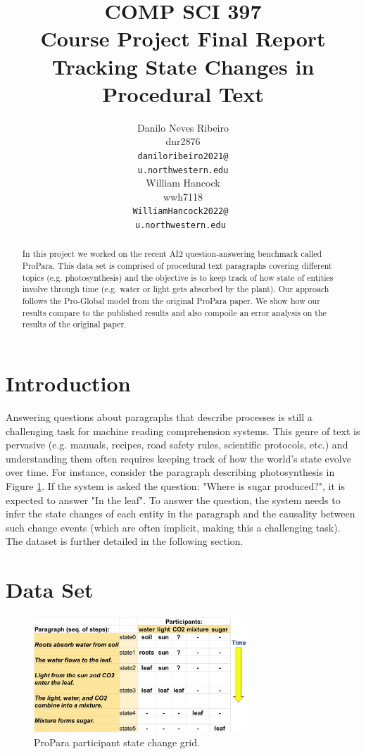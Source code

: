 \documentclass[11pt,a4paper]{article}
\title{COMP SCI 397 \\
    Course Project Final Report \\
    Tracking State Changes in Procedural Text}
\author{Danilo Neves Ribeiro \\
  dnr2876 \\
  {\tt daniloribeiro2021@} \\
  {\tt u.northwestern.edu} \\\And
  William Hancock \\
  wwh7118 \\
  {\tt WilliamHancock2022@ } \\
  {\tt u.northwestern.edu } \\}
\date{}
\begin{document}
\maketitle
\begin{abstract}
  In this project we worked on the recent AI2 question-answering 
  benchmark called ProPara. This data set is comprised of procedural 
  text paragraphs covering different topics (e.g. photosynthesis) and 
  the objective is to keep track of how state of entities involve through 
  time (e.g. water or light gets absorbed by the plant). Our approach 
  follows the Pro-Global model from the original ProPara paper. We 
  show how our results compare to the published results and also 
  compoile an error analysis on the results of the original paper.
\end{abstract}

\section{Introduction}

Answering questions about paragraphs that describe processes is still 
a challenging task for machine reading comprehension systems. This 
genre of text is pervasive (e.g. manuals, recipes, road safety rules, 
scientific protocols, etc.) and understanding them often requires 
keeping track of how the world’s state evolve over time. For instance, 
consider the paragraph describing photosynthesis in Figure 
\ref{fig:participant-grid}. If the system is asked the question: 
"Where is sugar produced?", it is expected to answer "In the leaf". 
To answer the question, the system needs to infer the state changes 
of each entity in the paragraph and the causality between such change 
events (which are often implicit, making this a challenging task). The 
dataset is further detailed in the following section.

\section{Data Set}

\begin{figure}[h]
\includegraphics[width=8cm]{participant-grid-simple.JPG}
\caption{ProPara participant state change grid.}
\label{fig:participant-grid}
\end{figure}
\end{document}
